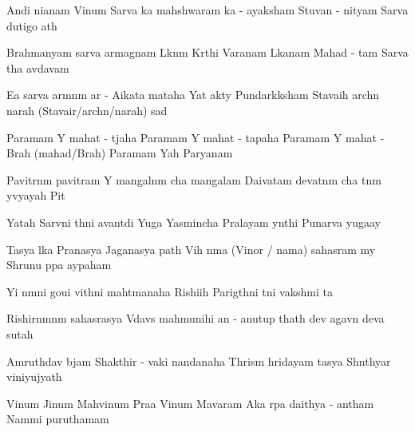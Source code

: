 \documentclass[20pt]{article}
\begin{document}
\SlokaHuge
{An{\aaa}di ni{\dhh}anam Vi{\sh}num} {Sarva {\lo}ka mah{\e}shwaram}
{{\Lo}ka - a{\dhh}yaksham Stuvan - nityam} {Sarva du{\kh}{\A}tigo {\bh}a{\ve}th}

\SlokaHuge
{Brahmanyam sarva {\Dh}armagnam} {L{\oh}k{\A}n{\A}m K{\ee}rthi Var{\dhh}anam}
{L{\oh}kan{\A}{\Th}am Mahad - {\bh}{\oo}tam} {Sarva {\Bh}{\oo}tha {\bh}av{\oh}d{\bh}avam}

\SlokaHuge
{E{\sh}a {\me} sarva {\Dh}arm{\A}n{\A}m} {{\Dh}ar{\mo} - A{\dhh}ikata{\mo} mataha}
{Yat \dsh {\bh}akty{\A} Pundar{\ee}k{\A}ksham} {Stavaih arch{\e}n narah (Stavair/arch{\e}n/narah) sad{\A}}

\novspace
\SlokaHuge
{Paramam Y{\oh} mahat - t{\e}jaha} {Paramam Y{\oh} mahat - tapaha}
{Paramam Y{\oh} mahat - Brah{\ma} (mahad/Brah{\ma})} {Paramam Yah Par{\A}yanam}

\SlokaHuge
{Pavitr{\A}n{\A}m pavitram Y{\oh}} {mangal{\A}n{\A}m cha mangalam}
{Daivatam devat{\A}n{\A}m cha} {{\Bh}{\oo}t{\A}n{\A}m y{\oh}vyayah Pit{\A}}

\SlokaHuge
{Yatah Sarv{\A}ni {\Bh}{\oo}th{\A}ni} {{\Bh}avant{\ya}di Yu{\ga}ga{\me}}
{Yasmin{\sh}cha Pralayam y{\A}nthi} {Punar{\e}va yuga{\ksh}ay{\e}}

\SlokaHuge
{Tasya l{\oh}ka Pra{\dhh}{\A}nasya} {Jagan{\na}{\Th}asya {\Bh}{\oo}path{\e}}
{Vi{\sh}{\no}h \dsh n{\A}ma (Vi{\sh}nor / nama) sahasram m{\e}y} {Shrunu p{\A}pa {\bh}ay{\A}paham}

\novspace
\SlokaHuge
{Y{\an}i n{\A}m{\A}ni goui} {vi{\kh}{\ya}th{\A}ni mah{\A}tmanaha}
{Rishi{\bh}ih Parig{\ee}th{\A}ni} {t{\ha}ni vaksh{\ya}mi {\Bh}{\oo}ta{\ye}}

\SlokaHuge
{Rishirn{\A}mn{\A}m sahasrasya} {V{\e}dav{\ya}s{\oh} mah{\A}munihi}
{{\Ch}an{\dO} - anu{\sh}tup thath{\A} dev{\oh}} {{\Bh}agav{\A}n deva{\ki} sutah}

\SlokaHuge
{Amruth{\am}{\sh}{\oo}d{\bh}av{\oh} b{\ee}jam} {Shakthir - {\De}vaki nandanaha}
{Thris{\A}m{\A} hridayam tasya} {Sh{\aaa}nthyar{\tHe} viniyujyath{\e}}

\SlokaHuge
{Vi{\sh}num Ji{\sh}num Mah{\A}vi{\sh}num} {Pra{\bh}a Vi{\sh}num Ma{\he}{\sh}varam}
{A{\nE}ka r{\oo}pa daithya - antham} {Nam{\A}mi puru{\sho}thamam}


\end{document}
